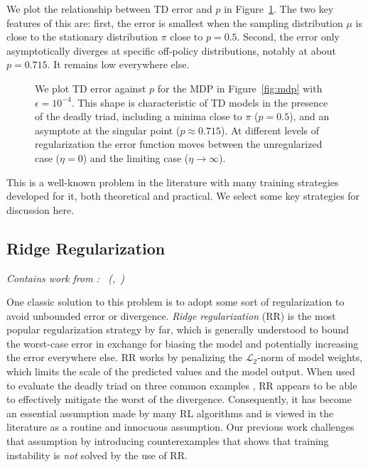 \documentclass[11pt]{article}
\newcommand{\subsectionsubtitle}[1]{\vspace{-0.5em}\textit{#1}\vspace{0.5em}}
\begin{document}
We plot the relationship between TD error and $p$ in Figure~\ref{fig:fixedpointp}. The two key features of this are: first, the error is smallest when the sampling distribution $\mu$ is close to the stationary distribution $\pi$ close to $p=0.5$. Second, the error only asymptotically diverges at specific off-policy distributions, notably at about $p=0.715$. It remains low everywhere else.

\begin{figure}[!p]
    
    \caption{We plot TD error against $p$ for the MDP in Figure~\ref{fig:mdp} with $\epsilon=10^{-4}$. This shape is characteristic of TD models in the presence of the deadly triad, including a minima close to $\pi$ ($p=0.5$), and an asymptote at the singular point ($p\approx 0.715$). At different levels of regularization the error function moves between the unregularized case ($\eta=0$) and the limiting case ($\eta\to\infty$).}
    \label{fig:fixedpointp}
\end{figure}

This is a well-known problem in the literature with many training strategies developed for it, both theoretical and practical. We select some key strategies for discussion here.

\subsection{Ridge Regularization}
\subsectionsubtitle{Contains work from \cite{manek2022pitfalls}: \citetitle{manek2022pitfalls}~(\citeauthor{manek2022pitfalls},~\citeyear{manek2022pitfalls})}
\label{sec:rr}

One classic solution to this problem is to adopt some sort of regularization to avoid unbounded error or divergence. \emph{Ridge regularization} (RR) \cite{tikhonov1943stability} is the most popular regularization strategy by far, which is generally understood to bound the worst-case error in exchange for biasing the model and potentially increasing the error everywhere else. RR works by penalizing the $\mathcal L_2$-norm of model weights, which limits the scale of the predicted values and the model output. When used to evaluate the deadly triad on three common examples \cite[pg.260]{kolter2011fixed,baird1993counterexample,sutton2020reinforcement}, RR appears to be able to effectively mitigate the worst of the divergence. Consequently, it has become an essential assumption made by many RL algorithms \cite{diddigi2019convergent,mahadevan2014proximal,sutton2009fast,yu2017convergence,zhang2020provably,zhang2021breaking} and is viewed in the literature as a routine and innocuous assumption. Our previous work \citep{manek2022pitfalls} challenges that assumption by introducing counterexamples that shows that training instability is \emph{not} solved by the use of RR.
\end{document}
